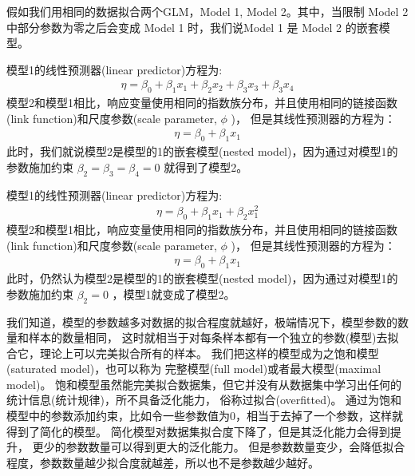 \documentclass[letterpaper,10pt,english]{sphinxmanual}
\begin{document}
假如我们用相同的数据拟合两个GLM，Model 1, Model 2。其中，当限制
Model 2 中部分参数为零之后会变成 Model 1 时，我们说Model 1 是 Model 2 的嵌套模型。

\begin{sphinxShadowBox}

模型1的线性预测器(linear predictor)方程为:
\begin{equation}\label{equation:模型评估/content:模型评估/content:0}
\begin{split}\eta = \beta_0 + \beta_1 x_1 + \beta_2 x_2 + \beta_3 x_3 + \beta_3 x_4\end{split}
\end{equation}
模型2和模型1相比，响应变量使用相同的指数族分布，并且使用相同的链接函数(link function)和尺度参数(scale parameter, \(\phi\) )，
但是其线性预测器的方程为：
\begin{equation}\label{equation:模型评估/content:模型评估/content:1}
\begin{split}\eta = \beta_0 + \beta_1 x_1\end{split}
\end{equation}
此时，我们就说模型2是模型的1的嵌套模型(nested model)，因为通过对模型1的参数施加约束 \(\beta_2=\beta_3=\beta_4=0\)
就得到了模型2。
\end{sphinxShadowBox}

\begin{sphinxShadowBox}

模型1的线性预测器(linear predictor)方程为:
\begin{equation}\label{equation:模型评估/content:模型评估/content:2}
\begin{split}\eta = \beta_0 + \beta_1 x_1 + \beta_2 x_1^2\end{split}
\end{equation}
模型2和模型1相比，响应变量使用相同的指数族分布，并且使用相同的链接函数(link function)和尺度参数(scale parameter, \(\phi\) )，
但是其线性预测器的方程为：
\begin{equation}\label{equation:模型评估/content:模型评估/content:3}
\begin{split}\eta = \beta_0 + \beta_1 x_1\end{split}
\end{equation}
此时，仍然认为模型2是模型的1的嵌套模型(nested model)，因为通过对模型1的参数施加约束 \(\beta_2=0\)
，模型1就变成了模型2。
\end{sphinxShadowBox}

我们知道，模型的参数越多对数据的拟合程度就越好，极端情况下，模型参数的数量和样本的数量相同，
这时就相当于对每条样本都有一个独立的参数(模型)去拟合它，理论上可以完美拟合所有的样本。
我们把这样的模型成为之饱和模型(saturated model)，也可以称为
完整模型(full model)或者最大模型(maximal model)。
饱和模型虽然能完美拟合数据集，但它并没有从数据集中学习出任何的统计信息(统计规律)，所不具备泛化能力，
俗称过拟合(over\sphinxhyphen{}fitted)。
通过为饱和模型中的参数添加约束，比如令一些参数值为0，相当于去掉了一个参数，这样就得到了简化的模型。
简化模型对数据集拟合度下降了，但是其泛化能力会得到提升，
更少的参数数量可以得到更大的泛化能力。
但是参数数量变少，会降低拟合程度，参数数量越少拟合度就越差，所以也不是参数越少越好。
\end{document}

